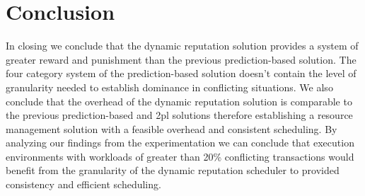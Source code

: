 \section{Conclusion}
\label{sec:conclusion}


In closing we conclude that the dynamic reputation solution provides a system of greater reward and punishment than the previous prediction-based solution. The four category system of the prediction-based solution doesn't contain the level of granularity needed to establish dominance in conflicting situations. We also conclude that the overhead of the dynamic reputation solution is comparable to the previous prediction-based and \gls{2pl} solutions therefore establishing a resource management solution with a feasible overhead and consistent scheduling. By analyzing our findings from the experimentation we can conclude that execution environments with workloads of greater than 20\% conflicting transactions would benefit from the granularity of the dynamic reputation scheduler to provided consistency and efficient scheduling.